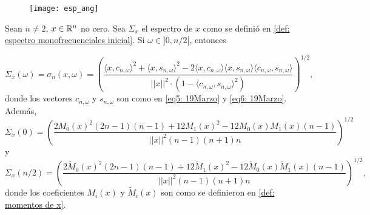 \begin{figure}[H]
	\centering
	\texttt{[image: esp\_ang]} 
\end{figure}	

\begin{comment}
Esta última proposición es importante, pues relaciona
el espectro de una señal 
con sus primeros dos coeficientes respecto a la base
de Legendre discreta $\cali{L}^{n}$. \\
Note que este es un resultado razonable, pues, por
definición del espectro $\Sigma_{x}$, si $\omega \geq 0$,
$\Sigma_{x}(\omega)$ es el coseno del ángulo que
$x$ forma con el espacio $P_{n, \omega} = 
span \left\{ cos \left(
2 \pi \omega\frac{m}{n}
\right)_{m=0}^{n-1},  
sen \left(
2 \pi \omega\frac{m}{n}
\right)_{m=0}^{n-1} \right\}$, y, conforme
$\omega$ tiende a cero por la derecha, 
las discretizaciones de coseno y seno que generan
el espacio $P_{n, \omega}$ tienden a ser las discretizaciones
de cosenos y senos de muy baja frecuencia, luego, intuitivamente
son las discretizaciones de las rectas tangentes de un coseno
y un seno en $t =0$, que son las rectas $y=1$
y $y =x$. Observe que discretizaciones de estas dos rectas
conforman una base para el espacio $W_{n,1}$.
\end{comment}

\begin{prop}
\label{prop: formula explicita espectro}
Sean $n \neq 2$, $x \in \mathbb{R}^{n}$ no cero.
Sea $\Sigma_{x}$ el espectro de $x$ como se definió en 
\ref{def: espectro monofrecuenciales inicial}.
Si $\omega \in ]0, n/2[$, entonces

\[
\Sigma_{x}(\omega) = 
\sigma_{n}(x, \omega) =
	\left(		  
		  \frac{\langle x, c_{n, \omega } \rangle^{2} +  \langle x, s_{n, \omega } \rangle^{2}	
	       -2  \langle x, c_{n, \omega } \rangle \langle x, s_{n, \omega } \rangle \langle c_{n, \omega }, s_{n, \omega } \rangle}{ || x ||^{2} \cdot
	       (1- \langle c_{n, \omega }, s_{n, \omega } \rangle^{2})}	  
\right) ^{1/2},
\]
donde los vectores $c_{n, \omega}$ y $s_{n, \omega}$
son como en \eqref{eq5: 19Marzo} y \eqref{eq6: 19Marzo}.
Además, 
\[
\Sigma_{x}(0) = 
\left(
\frac{
2M_{0}(x)^{2}(2n-1)(n-1) + 12M_{1}(x)^{2} - 12M_{0}(x)M_{1}(x)(n-1)
}{
||x||^{2} (n-1)(n+1)n}
\right)^{1/2}
\]
y
\[
\Sigma_{x}(n/2) = 
\left(
\frac{
2\tilde{M}_{0}(x)^{2}(2n-1)(n-1) + 12
\tilde{M}_{1}(x)^{2} - 12 \tilde{M}_{0}(x) \tilde{M}_{1}(x)(n-1)
}{
||x||^{2} (n-1)(n+1)n}
\right)^{1/2},
\]
donde los coeficientes $M_{i}(x)$ y $\tilde{M}_{i}(x)$
son como se definieron en 
\ref{def: momentos de x}. 
\end{prop}

